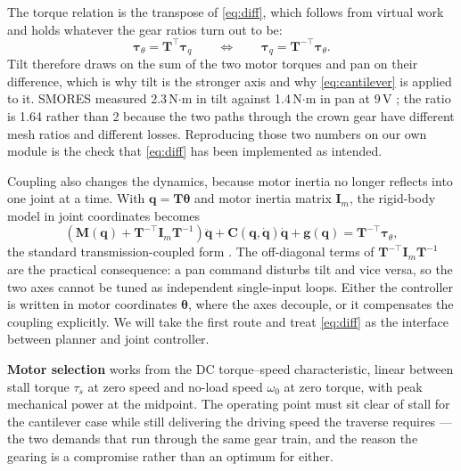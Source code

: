 \documentclass[11pt,a4paper]{article}
\begin{document}
{The torque relation is the transpose of \eqref{eq:diff}, which follows from
virtual work and holds whatever the gear ratios turn out to be:
\begin{equation}
  \boldsymbol{\tau}_{\theta} = \mathbf{T}^{\!\top}\boldsymbol{\tau}_{q}
  \qquad\Longleftrightarrow\qquad
  \boldsymbol{\tau}_{q} = \mathbf{T}^{-\top}\boldsymbol{\tau}_{\theta}.
\end{equation}
Tilt therefore draws on the sum of the two motor torques and pan on their
difference, which is why tilt is the stronger axis and why
\eqref{eq:cantilever} is applied to it. SMORES measured 2.3\,N$\cdot$m in tilt
against 1.4\,N$\cdot$m in pan at 9\,V \cite{davey2012}; the ratio is 1.64
rather than 2 because the two paths through the crown gear have different mesh
ratios and different losses. Reproducing those two numbers on our own module is
the check that \eqref{eq:diff} has been implemented as intended.

Coupling also changes the dynamics, because motor inertia no longer reflects
into one joint at a time. With $\mathbf{q} = \mathbf{T}\boldsymbol{\theta}$ and
motor inertia matrix $\mathbf{I}_m$, the rigid-body model in joint coordinates
becomes
\begin{equation}
  \left(\mathbf{M}(\mathbf{q}) + \mathbf{T}^{-\top}\mathbf{I}_m\mathbf{T}^{-1}\right)\ddot{\mathbf{q}}
  + \mathbf{C}(\mathbf{q},\dot{\mathbf{q}})\dot{\mathbf{q}}
  + \mathbf{g}(\mathbf{q})
  = \mathbf{T}^{-\top}\boldsymbol{\tau}_{\theta},
  \label{eq:coupleddyn}
\end{equation}
the standard transmission-coupled form \cite{siciliano2009,craig2005}. The
off-diagonal terms of $\mathbf{T}^{-\top}\mathbf{I}_m\mathbf{T}^{-1}$ are the
practical consequence: a pan command disturbs tilt and vice versa, so the two
axes cannot be tuned as independent single-input loops. Either the controller
is written in motor coordinates $\boldsymbol{\theta}$, where the axes decouple,
or it compensates the coupling explicitly. We will take the first route and
treat \eqref{eq:diff} as the interface between planner and joint controller.

\noindent\textbf{Motor selection} works from the DC torque--speed
characteristic, linear between stall torque $\tau_s$ at zero speed and no-load
speed $\omega_0$ at zero torque, with peak mechanical power at the midpoint.
The operating point must sit clear of stall for the cantilever case while still
delivering the driving speed the traverse requires --- the two demands that run
through the same gear train, and the reason the gearing is a compromise rather
than an optimum for either.

}
\end{document}
